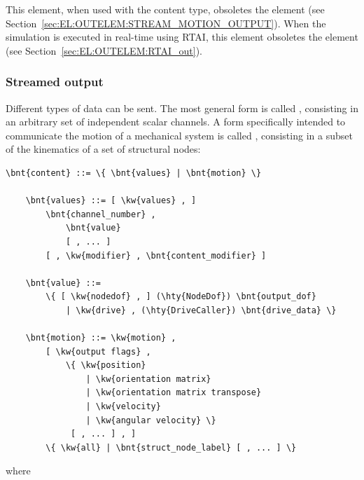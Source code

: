 This element, when used with the  content type,
obsoletes the  element
(see Section~\ref{sec:EL:OUTELEM:STREAM_MOTION_OUTPUT}).
When the simulation is executed in real-time using RTAI,
this element obsoletes the  element
(see Section~\ref{sec:EL:OUTELEM:RTAI_out}).



\subsubsection{Streamed output}
Different types of data can be sent.
The most general form is called , consisting
in an arbitrary set of independent scalar channels.
A form specifically intended to communicate the motion
of a mechanical system is called , consisting
in a subset of the kinematics of a set of structural nodes:
\begin{Verbatim}[commandchars=\\\{\}]
    \bnt{content} ::= \{ \bnt{values} | \bnt{motion} \}

    \bnt{values} ::= [ \kw{values} , ]
        \bnt{channel_number} ,
            \bnt{value}
            [ , ... ]
        [ , \kw{modifier} , \bnt{content_modifier} ]

    \bnt{value} ::=
        \{ [ \kw{nodedof} , ] (\hty{NodeDof}) \bnt{output_dof}
            | \kw{drive} , (\hty{DriveCaller}) \bnt{drive_data} \}

    \bnt{motion} ::= \kw{motion} ,
        [ \kw{output flags} ,
            \{ \kw{position}
                | \kw{orientation matrix}
                | \kw{orientation matrix transpose}
                | \kw{velocity}
                | \kw{angular velocity} \}
             [ , ... ] , ]
        \{ \kw{all} | \bnt{struct_node_label} [ , ... ] \}
\end{Verbatim}
where

